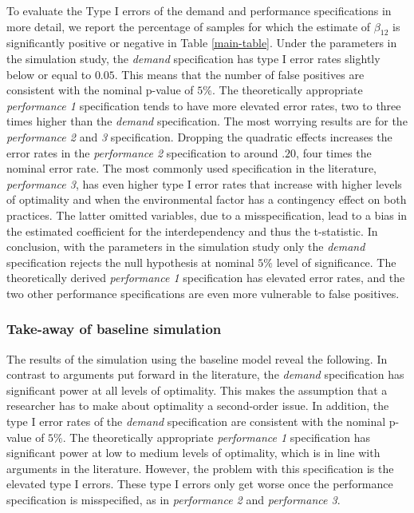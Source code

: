 \documentclass[12pt]{article}
\begin{document}
To evaluate the Type I errors of the demand and performance specifications in more detail, we report the percentage of samples for which the estimate of $\beta_{12}$ is significantly positive or negative  in Table \ref{main-table}. Under the parameters in the simulation study, the \emph{demand} specification has type I error rates slightly below or equal to $0.05$. This means that the number of false positives are consistent with the nominal p-value of $5\%$. The theoretically appropriate \emph{performance 1} specification tends to have more elevated error rates, two to three times higher than the \emph{demand} specification. The most worrying results are for the \emph{performance 2} and \emph{3} specification. Dropping the quadratic effects increases the error rates in the \emph{performance 2} specification to around $.20$, four times the nominal error rate. The most commonly used specification in the literature, \emph{performance 3}, has even higher type I error rates that increase with higher levels of optimality and when the environmental factor has a contingency effect on both practices. The latter omitted variables, due to a misspecification, lead to a bias in the estimated coefficient for the interdependency and thus the t-statistic. In conclusion, with the parameters in the simulation study only the \emph{demand} specification rejects the null hypothesis at nominal $5\%$ level of significance. The theoretically derived \emph{performance 1} specification has elevated error rates, and the two other performance specifications are even more vulnerable to false positives.

\subsubsection{Take-away of baseline simulation}\label{Take-away of baseline simulation}
The results of the simulation using the baseline model reveal the following. In contrast to arguments put forward in the literature, the \emph{demand} specification has significant power at all levels of optimality. This makes the assumption that a researcher has to make about optimality a second-order issue. In addition, the type I error rates of the \emph{demand} specification are consistent with the nominal p-value of $5\%$. The theoretically appropriate \emph{performance 1} specification has significant power at low to medium levels of optimality, which is in line with arguments in the literature. However, the problem with this specification is the elevated type I errors. These type I errors only get worse once the performance specification is misspecified, as in \emph{performance 2} and \emph{performance 3}.
\end{document}
